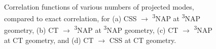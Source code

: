\begin{figure}[!t]
\\
\caption{
Correlation functions of various numbers of projected modes, compared to exact correlation, for (a) CSS $\rightarrow$ \textsuperscript{3}NAP at \textsuperscript{3}NAP geometry, (b) CT $\rightarrow$ \textsuperscript{3}NAP at \textsuperscript{3}NAP geometry, (c) CT $\rightarrow$ \textsuperscript{3}NAP at CT geometry, and (d) CT $\rightarrow$ CSS at CT geometry.
}\label{corrT1T3}
\end{figure}
